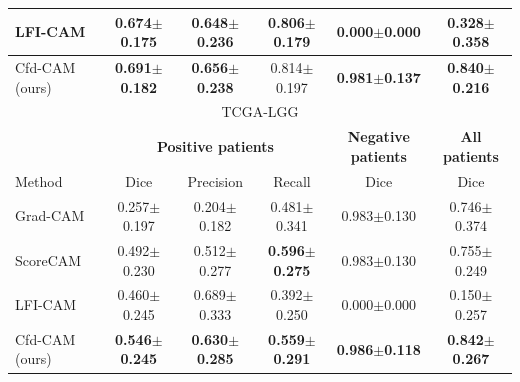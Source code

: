 \begin{table}[t]
\begin{tabular}{l|c|c|c|c|c}
LFI-CAM\cite{lee2021lfi}         & 0.674$\pm$0.175          & 0.648$\pm$0.236          & 0.806$\pm$0.179          & 0.000$\pm$0.000               & 0.328$\pm$0.358          \\ \hline
Cfd-CAM (ours)   & \textbf{0.691$\pm$0.182} & \textbf{0.656$\pm$0.238} & 0.814$\pm$0.197 & \textbf{0.981$\pm$0.137}      & \textbf{0.840$\pm$0.216} \\ \hline \hline
\multicolumn{6}{c}{TCGA-LGG} \\ \hline
{\textbf{}}        & \multicolumn{3}{c|}{\textbf{Positive patients}} & \textbf{Negative patients} & \textbf{All patients} \\ \hline
Method           & Dice                  & Precision             & Recall                & Dice                       & Dice             \\ \hline
Grad-CAM\cite{selvaraju2017grad}        & 0.257$\pm$0.197          & 0.204$\pm$0.182          & 0.481$\pm$0.341          & 0.983$\pm$0.130               & 0.746$\pm$0.374          \\ \hline
ScoreCAM\cite{wang2020score}        & 0.492$\pm$0.230          & 0.512$\pm$0.277          & \textbf{0.596$\pm$0.275}          & 0.983$\pm$0.130               & 0.755$\pm$0.249         \\ \hline
LFI-CAM\cite{lee2021lfi}         & 0.460$\pm$0.245          & 0.689$\pm$0.333          & 0.392$\pm$0.250          & 0.000$\pm$0.000               & 0.150$\pm$0.257          \\ \hline
Cfd-CAM (ours) & \textbf{0.546$\pm$0.245}   & \textbf{0.630$\pm$0.285} & \textbf{0.559$\pm$0.291} & \textbf{0.986$\pm$0.118}      & \textbf{0.842$\pm$0.267} \\ \hline
\end{tabular}
\end{table}